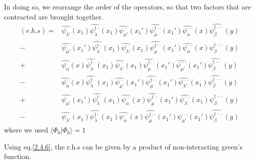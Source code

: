 In doing so, we rearrange the order of the operators, so that two factors that are contracted are brought together.
\begin{align}
(r.h.s)=&\hat{\psi_{\lambda'}^{\cdot}}(x_1)\hat{\psi_{\lambda}^{\dagger\cdot}}(x_1)\hat{\psi_{\mu'}^{\cdot\cdot}}(x_1')\hat{\psi_{\mu}^{\dagger\cdot\cdot}}(x_1')\hat{\psi_{\alpha}^{\cdot\cdot\cdot}}(x)\hat{\psi_{\beta}^{\dagger\cdot\cdot\cdot}}(y)\nonumber \\
-&\hat{\psi_{\mu'}^{\cdot}}(x_1')\hat{\psi_{\lambda}^{\dagger\cdot}}(x_1)\hat{\psi_{\lambda'}^{\cdot\cdot}}(x_1)\hat{\psi_{\mu}^{\dagger\cdot\cdot}}(x_1')\hat{\psi_{\alpha}^{\cdot\cdot\cdot}}(x)\hat{\psi_{\beta}^{\dagger\cdot\cdot\cdot}}(y)\nonumber \\
+&\hat{\psi_{\alpha}^{\cdot}}(x)\hat{\psi_{\lambda}^{\dagger\cdot}}(x_1)\hat{\psi_{\lambda'}^{\cdot\cdot}}(x_1)\hat{\psi_{\mu}^{\dagger\cdot\cdot}}(x_1')\hat{\psi_{\mu'}^{\cdot\cdot\cdot}}(x_1')\hat{\psi_{\beta}^{\dagger\cdot\cdot\cdot}}(y)\nonumber \\
-&\hat{\psi_{\alpha}^{\cdot}}(x)\hat{\psi_{\lambda}^{\dagger\cdot}}(x_1)\hat{\psi_{\mu'}^{\cdot\cdot}}(x_1')\hat{\psi_{\mu}^{\dagger\cdot\cdot}}(x_1')\hat{\psi_{\lambda'}^{\cdot\cdot\cdot}}(x_1)\hat{\psi_{\beta}^{\dagger\cdot\cdot\cdot}}(y)\nonumber \\
+&\hat{\psi_{\mu'}^{\cdot}}(x_1')\hat{\psi_{\lambda}^{\dagger\cdot}}(x_1)\hat{\psi_{\alpha}^{\cdot\cdot}}(x)\hat{\psi_{\mu}^{\dagger\cdot\cdot}}(x_1')\hat{\psi_{\lambda'}^{\cdot\cdot\cdot}}(x_1)\hat{\psi_{\beta}^{\dagger\cdot\cdot\cdot}}(y)\nonumber \\
-&\hat{\psi_{\lambda'}^{\cdot}}(x_1)\hat{\psi_{\lambda}^{\dagger\cdot}}(x_1)\hat{\psi_{\alpha}^{\cdot\cdot}}(x)\hat{\psi_{\mu}^{\dagger\cdot\cdot}}(x_1')\hat{\psi_{\mu'}^{\cdot\cdot\cdot}}(x_1')\hat{\psi_{\beta}^{\dagger\cdot\cdot\cdot}}(y)\nonumber 
\end{align}
where we used $\langle\Phi_0|\Phi_0\rangle=1$

Using eq.\eqref{2.4.6}, the r.h.s can be given by a product of non-interacting green's function.

